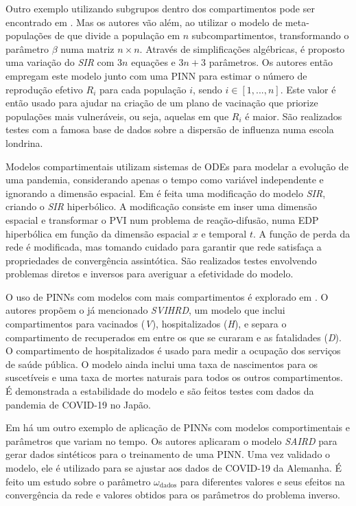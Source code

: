 Outro exemplo utilizando subgrupos dentro dos compartimentos pode ser encontrado
em \cite{arulandu-etal:23-vacinacao}. Mas os autores vão além, ao utilizar 
o modelo de meta-populações de \cite{jacquez:1988-modelagam-hiv-matriz} que 
divide a população em $n$ subcompartimentos, transformando o parâmetro $\beta$ 
numa matriz $n \times n$. Através de simplificações algébricas, é proposto uma 
variação do \textit{SIR} com $3n$ equações e $3n + 3$ parâmetros.
Os autores então empregam este modelo junto com uma PINN para estimar o número 
de reprodução efetivo $R_i$ para cada população $i$, sendo $i \in [1,...,n]$. 
Este valor é então usado para ajudar na criação de um plano de vacinação que 
priorize populações mais vulneráveis, ou seja, aquelas em que $R_i$ é maior.
São realizados testes com a famosa base de dados sobre a dispersão de influenza
numa escola londrina.  

Modelos compartimentais utilizam sistemas de ODEs para modelar a evolução
de uma pandemia, considerando apenas o tempo como variável independente e 
ignorando a dimensão espacial.
Em \cite{bertaglia-etal:22-sir-reacao-difusao} é feita uma modificação do 
modelo \textit{SIR}, criando o \textit{SIR} hiperbólico. 
A modificação consiste em inser uma dimensão espacial e transformar o PVI
num problema de reação-difusão, numa EDP hiperbólica em função da dimensão espacial $x$
e temporal $t$. A função de perda da rede é modificada, mas tomando cuidado
para garantir que rede satisfaça a propriedades de convergência assintótica.
São realizados testes envolvendo problemas diretos e inversos para averiguar
a efetividade do modelo.

O uso de PINNs com modelos com mais compartimentos é explorado em \cite{nelson-etal:24-japao}.
O autores propõem o já mencionado \textit{SVIHRD}, um modelo que inclui 
compartimentos para vacinados (\textit{V}), hospitalizados (\textit{H}), 
e separa o compartimento de recuperados em entre os que se curaram e as 
fatalidades (\textit{D}).
O compartimento de hospitalizados é usado para medir a ocupação dos serviços de
saúde pública.
O modelo ainda inclui uma taxa de nascimentos para os 
suscetíveis e uma taxa de mortes naturais para todos os outros compartimentos.
É demonstrada a estabilidade do modelo e são feitos testes com dados da pandemia 
de COVID-19 no Japão.

Em \cite{han-etal:24-prim-artigo-alemanha} há um outro exemplo de aplicação de
PINNs com modelos comportimentais e parâmetros que variam no tempo. Os autores
aplicaram o modelo \textit{SAIRD} para gerar dados sintéticos para 
o treinamento de uma PINN. Uma vez validado o modelo, ele é utilizado para se
ajustar aos dados de COVID-19 da Alemanha. É feito um estudo sobre o
parâmetro $\omega_{\text{dados}}$ para diferentes valores e seus efeitos na 
convergência da rede e valores obtidos para os parâmetros do problema inverso. 

